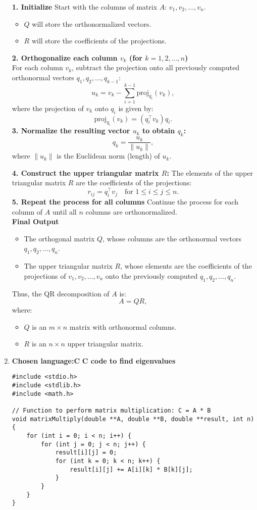 \documentclass[journal]{IEEEtran}
\begin{document}
\begin{enumerate}
\textbf{1. Initialize}
Start with the columns of matrix $A$: $v_1, v_2, \ldots, v_n$.  
\begin{itemize}
    \item $Q$ will store the orthonormalized vectors.
    \item $R$ will store the coefficients of the projections.
\end{itemize}
\textbf{2. Orthogonalize each column $v_k$ (for $k = 1, 2, \ldots, n$)}\\
For each column $v_k$, subtract the projection onto all previously computed orthonormal vectors $q_1, q_2, \ldots, q_{k-1}$:
\[
u_k = v_k - \sum_{i=1}^{k-1} \text{proj}_{q_i}(v_k),
\]
where the projection of $v_k$ onto $q_i$ is given by:
\[
\text{proj}_{q_i}(v_k) = (q_i^\top v_k) q_i.
\]
\textbf{3. Normalize the resulting vector $u_k$ to obtain $q_k$:}
\[
q_k = \frac{u_k}{\|u_k\|},
\]
where $\|u_k\|$ is the Euclidean norm (length) of $u_k$.

\textbf{4. Construct the upper triangular matrix $R$:}
The elements of the upper triangular matrix $R$ are the coefficients of the projections:
\[
r_{ij} = q_i^\top v_j \quad \text{for } 1 \leq i \leq j \leq n.
\]
\textbf{5. Repeat the process for all columns}
Continue the process for each column of $A$ until all $n$ columns are orthonormalized.\\
\textbf{Final Output}
\begin{itemize}
    \item The orthogonal matrix $Q$, whose columns are the orthonormal vectors $q_1, q_2, \ldots, q_n$.
    \item The upper triangular matrix $R$, whose elements are the coefficients of the projections of $v_1, v_2, \ldots, v_n$ onto the previously computed $q_1, q_2, \ldots, q_n$.
\end{itemize}
Thus, the QR decomposition of $A$ is:
\[
A = QR,
\]
where:
\begin{itemize}
    \item $Q$ is an $m \times n$ matrix with orthonormal columns.
    \item $R$ is an $n \times n$ upper triangular matrix.
\end{itemize}
\item \textbf{Chosen language:C}
\textbf{C code to find eigenvalues}\\
\begin{lstlisting}
#include <stdio.h>
#include <stdlib.h>
#include <math.h>

// Function to perform matrix multiplication: C = A * B
void matrixMultiply(double **A, double **B, double **result, int n) {
    for (int i = 0; i < n; i++) {
        for (int j = 0; j < n; j++) {
            result[i][j] = 0;
            for (int k = 0; k < n; k++) {
                result[i][j] += A[i][k] * B[k][j];
            }
        }
    }
}


\end{lstlisting}
\end{enumerate}
\end{document}
